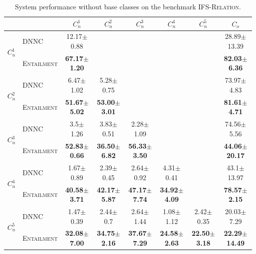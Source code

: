 \documentclass[11pt]{article}
\newcommand{\modelname}{\textsc{Entailment}}
\newcommand{\relationdata}{\textsc{IFS-Relation}}
\begin{document}
\begin{table}[t]
\setlength{\tabcolsep}{4.5pt}
\small
  \centering
  \begin{tabular}{ll|c|c|c|c|c|c}
 &  & $C_n^1$ & $C_n^2$ & $C_n^3$ & $C_n^4$ & $C_n^5$ & $C_o$\\\hline\hline 

 \multirow{2}{*}{$C_n^1$} 
 &  DNNC & 12.17$\pm$0.88 & & & & & 28.89$\pm$13.39 \\
 & \modelname &\textbf{67.17$\pm$1.20} & & & & &\textbf{82.03$\pm$6.36}\\\hline

 \multirow{2}{*}{$C_n^2$} &  DNNC &6.47$\pm$1.02 &5.28$\pm$0.75 & & & &73.97$\pm$4.83  \\
 &   \modelname &\textbf{51.67$\pm$5.02} &\textbf{53.00$\pm$3.01} & & & &\textbf{81.61$\pm$4.71}\\\hline
 
  \multirow{2}{*}{$C_n^3$} &  DNNC & 3.5$\pm$1.26 & 3.83$\pm$0.51& 2.28$\pm$1.09& & &   74.56$\pm$5.56\\
  &   \modelname  &\textbf{52.83$\pm$0.66} &\textbf{36.50$\pm$6.82} &\textbf{56.33$\pm$3.50} & & &\textbf{44.06$\pm$20.17} \\\hline
  
   \multirow{2}{*}{$C_n^4$}& DNNC & 1.67$\pm$0.89 & 2.39$\pm$0.45& 2.64$\pm$0.92 & 4.31$\pm$0.41 & &43.1$\pm$13.97 \\
   &   \modelname &\textbf{40.58$\pm$3.71} &\textbf{42.17$\pm$5.87} &\textbf{47.17$\pm$7.74} & \textbf{34.92$\pm$4.09}& &\textbf{78.57$\pm$2.15}\\\hline
  
   \multirow{2}{*}{$C_n^5$} &  DNNC & 1.47$\pm$0.39 &2.44$\pm$0.7 & 2.64$\pm$1.44 &1.08$\pm$1.12& 2.42$\pm$0.35 & 20.03$\pm$7.29 \\
   &  \modelname &\textbf{32.08$\pm$7.00} & \textbf{34.75$\pm$2.16}&\textbf{37.67$\pm$7.29}& \textbf{24.58$\pm$2.63}& \textbf{22.50$\pm$3.18}&\textbf{22.29$\pm$14.49}\\ \hline
\end{tabular}
\caption{System performance without base classes on the benchmark \relationdata.
}\label{tab:relationresults_withoutbase}
\end{table}
\end{document}
